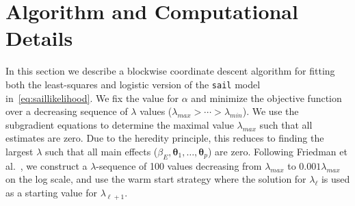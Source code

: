 \documentclass[12pt,letter]{article}\usepackage[]{graphicx}\usepackage[]{color}
\newcommand{\xmark}{\ding{55}}%
\newcommand{\btheta}{\boldsymbol{\theta}}
\begin{document}

\section{Algorithm and Computational Details}

In this section we describe a blockwise coordinate descent algorithm for fitting both the least-squares and logistic version of the \texttt{sail} model in~\eqref{eq:saillikelihood}. We fix the value for $\alpha$ and minimize the objective function over a decreasing sequence of $\lambda$ values ($\lambda_{max}>\cdots>\lambda_{min}$). We use the subgradient equations to determine the maximal value $\lambda_{max}$ such that all estimates are zero. Due to the heredity principle, this reduces to finding the largest $\lambda$ such that all main effects ($\beta_E, \btheta_1, \ldots, \btheta_p$) are zero. Following Friedman et al.~\citep{friedman2010regularization}, we construct a $\lambda$-sequence of 100 values decreasing from $\lambda_{max}$ to $0.001 \lambda_{max}$ on the log scale, and use the warm start strategy where the solution for $\lambda_{\ell}$ is used as a starting value for $\lambda_{\ell + 1}$.  
\end{document}
